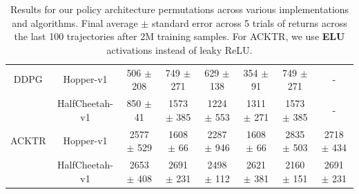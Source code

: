 \documentclass[letterpaper]{article} %
\begin{document}
\begin{table}
{\begin{tabular}{|c|c|c|c|c|c|c|c|}
         \hline
         DDPG& Hopper-v1 & 506 $\pm$ 208 & 749 $\pm$ 271 &629 $\pm$ 138 & 354 $\pm$ 91 &  749 $\pm$ 271 & - \\
         ~\cite{rllab}& HalfCheetah-v1 & 850 $\pm$ 41 &1573 $\pm$ 385 &1224 $\pm$ 553 & 1311 $\pm$ 271 & 1573 $\pm$ 385 & - \\
         \hline
         ACKTR& Hopper-v1 &2577 $\pm$ 529 & 1608 $\pm$ 66 &2287 $\pm$ 946 &1608 $\pm$ 66 & 2835 $\pm$ 503 &  2718 $\pm$ 434 \\
         \cite{ACKTR}& HalfCheetah-v1 &2653 $\pm$ 408&2691 $\pm$ 231 &2498 $\pm$ 112 &2621 $\pm$ 381&2160 $\pm$ 151&2691 $\pm$ 231\\
         \hline
    \end{tabular}}
    \caption{Results for our policy architecture permutations across various implementations and algorithms. Final average $\pm$ standard error across 5 trials of returns across the last 100 trajectories after 2M training samples. For ACKTR, we use \textbf{ELU} activations instead of leaky ReLU.}
    \label{tab:architecture_results}
\end{table}
\end{document}
